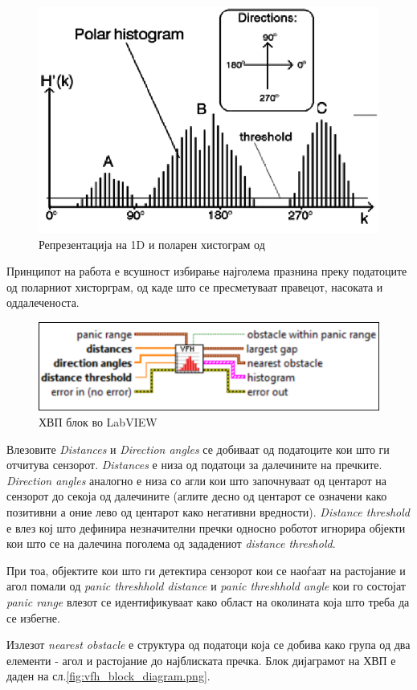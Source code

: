 \documentclass[12pt]{article}
\begin{document}
  \begin{figure}[H]
    \centering
    \includegraphics[width=0.5\linewidth]{./images/1d_his.png}
    \caption{Репрезентација на 1D и поларен хистограм од \cite{vfh_images}}
    \label{fig:1d_his.png}
    \end{figure}

  Принципот на работа е всушност избирање најголема празнина преку податоците од поларниот хисторграм, од каде што се пресметуваат правецот, насоката и оддалеченоста.

  \begin{figure}[H]
    \centering
    \includegraphics[width=0.5\linewidth]{./images/vfh_lv.png}
    \caption{ХВП блок во LabVIEW}
    \label{fig:vfh_lv.png}
    \end{figure}

  Влезовите \textit{Distances} и \textit{Direction angles} се добиваат од податоците кои што ги отчитува сензорот. \textit{Distances} е низа од податоци за далечините на пречките. \textit{Direction angles} аналогно е низа со агли кои што започнуваат од центарот на сензорот до секоја од далечините (аглите десно од центарот се означени како позитивни а оние лево од центарот како негативни вредности). \textit{Distance threshold} е влез кој што дефинира незначителни пречки односно роботот игнорира објекти кои што се на далечина поголема од зададениот \textit{distance threshold}.

  При тоа, објектите кои што ги детектира сензорот кои се наоѓаат на растојание и агол помали од \textit{panic threshhold distance} и \textit{panic threshhold angle} кои го состојат \textit{panic range} влезот се идентификуваат како област на околината која што треба да се избегне.

  Излезот \textit{nearest obstacle} е структура од податоци која се добива како група од два елементи - агол и растојание до најблиската пречка. Блок дијаграмот на ХВП е даден на сл.\ref{fig:vfh_block_diagram.png}.
\end{document}
